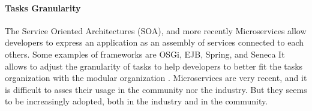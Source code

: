 


\paragraph{Tasks Granularity}

The Service Oriented Architectures (SOA), and more recently Microservices \cite{Fernandez-Villamor2010,Fowler2014,Namiot2014} allow developers to express an application as an assembly of services connected to each others.
Some examples of frameworks are OSGi, EJB, Spring, and Seneca
It allows to adjust the granularity of tasks to help developers to better fit the tasks organization with the modular organization \cite{Adam2008}.
Microservices are very recent, and it is difficult to asses their usage in the community nor the industry.
But they seems to be increasingly adopted, both in the industry and in the community.



